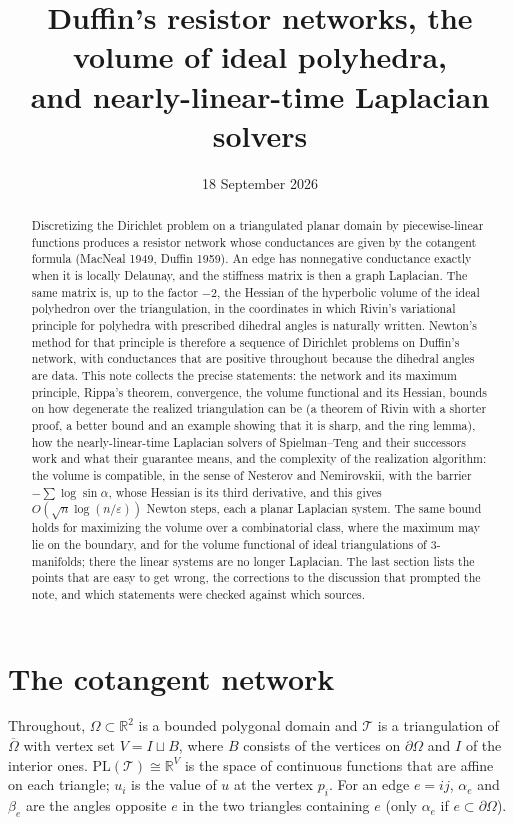 \documentclass[11pt]{amsart}
\title[Duffin's networks, hyperbolic volume, Laplacian solvers]{Duffin's resistor networks, the volume of ideal polyhedra,\\ and nearly-linear-time Laplacian solvers}
\date{18 September 2026}
\theoremstyle{definition}
\theoremstyle{remark}
\newcommand{\R}{\mathbb{R}}
\newcommand{\cT}{\mathcal{T}}
\newcommand{\PL}{\mathrm{PL}}
\newcommand{\eps}{\varepsilon}
\begin{document}
\begin{abstract}
Discretizing the Dirichlet problem on a triangulated planar domain by piecewise-linear functions
produces a resistor network whose conductances are given by the cotangent formula (MacNeal 1949, Duffin 1959).
An edge has nonnegative conductance exactly when it is locally Delaunay, and the stiffness matrix is then a graph Laplacian.
The same matrix is, up to the factor $-2$, the Hessian of the hyperbolic volume of the ideal polyhedron over the triangulation, in the coordinates in which Rivin's variational principle for polyhedra with prescribed dihedral angles is naturally written.
Newton's method for that principle is therefore a sequence of Dirichlet problems on Duffin's network, with conductances that are positive throughout because the dihedral angles are data.
This note collects the precise statements: the network and its maximum principle, Rippa's theorem, convergence, the volume functional and its Hessian, bounds on how degenerate the realized triangulation can be
(a theorem of Rivin with a shorter proof, a better bound and an example showing that it is sharp, and the ring lemma), how the nearly-linear-time Laplacian solvers of Spielman--Teng and their successors work and what their guarantee means, and the complexity of the realization algorithm: the volume is compatible, in the sense of Nesterov and Nemirovskii, with the barrier $-\sum\log\sin\alpha$, whose Hessian is its third derivative, and this gives $O(\sqrt n\log(n/\eps))$ Newton steps, each a planar Laplacian system. The same bound holds for maximizing the volume over a combinatorial class, where the maximum may lie on the boundary, and for the volume functional of ideal triangulations of $3$-manifolds; there the linear systems are no longer Laplacian.
The last section lists the points that are easy to get wrong, the corrections to the discussion that prompted the note, and which statements were checked against which sources.
\end{abstract}

\maketitle

\section{The cotangent network}\label{sec:cotan}

Throughout, $\Omega\subset\R^2$ is a bounded polygonal domain and $\cT$ is a triangulation of $\overline\Omega$
with vertex set $V=I\sqcup B$, where $B$ consists of the vertices on $\partial\Omega$ and $I$ of the interior ones.
$\PL(\cT)\cong\R^V$ is the space of continuous functions that are affine on each triangle; $u_i$ is the value of $u$ at the vertex $p_i$.
For an edge $e=ij$, $\alpha_e$ and $\beta_e$ are the angles opposite $e$ in the two triangles containing $e$
(only $\alpha_e$ if $e\subset\partial\Omega$).
\end{document}
